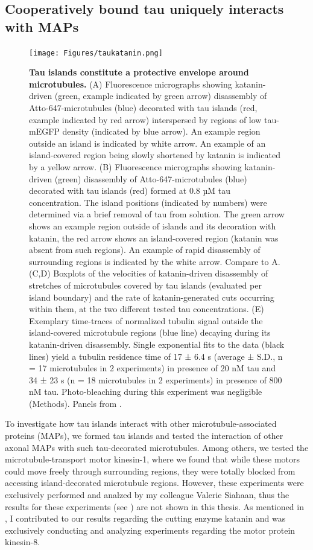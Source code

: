 \subsection{Cooperatively bound tau uniquely interacts with MAPs}
\begin{figure}[h!]
\centering
\texttt{[image: Figures/taukatanin.png]}
\caption[Tau islands constitute a protective envelope around microtubules.]{
\textbf{Tau islands constitute a protective envelope around microtubules.} (A) Fluorescence micrographs showing katanin-driven (green, example indicated by green arrow) disassembly of Atto-647-microtubules (blue) decorated with tau islands (red, example indicated by red arrow) interspersed by regions of low tau-mEGFP density (indicated by blue arrow). An example region outside an island is indicated by white arrow. An example of an island-covered region being slowly shortened by katanin is indicated by a yellow arrow. (B) Fluorescence micrographs showing katanin-driven (green) disassembly of Atto-647-microtubules (blue) decorated with tau islands (red) formed at 0.8 µM tau concentration. The island positions (indicated by numbers) were determined via a brief removal of tau from solution. The green arrow shows an example region outside of islands and its decoration with katanin, the red arrow shows an island-covered region (katanin was absent from such regions). An example of rapid disassembly of surrounding regions is indicated by the white arrow. Compare to A. (C,D) Boxplots of the velocities of katanin-driven disassembly of stretches of microtubules covered by tau islands (evaluated per island boundary) and the rate of katanin-generated cuts occurring within them, at the two different tested tau concentrations. (E) Exemplary time-traces of normalized tubulin signal outside the island-covered microtubule regions (blue line) decaying during its katanin-driven disassembly. Single exponential fits to the data (black lines) yield a tubulin residence time of 17 ± 6.4 s (average ± S.D., n = 17 microtubules in 2 experiments) in presence of 20 nM tau and 34 ± 23 s (n = 18 microtubules in 2 experiments) in presence of 800 nM tau. Photo-bleaching during this experiment was negligible (Methods). Panels from \cite{Siahaan2019a}.
	}\label{taukatanin}
\end{figure}
To investigate how tau islands interact with other microtubule-associated proteins (MAPs), we formed tau islands and tested the interaction of other axonal MAPs with such tau-decorated microtubules. Among others, we tested the microtubule-transport motor kinesin-1, where we found that while these motors could move freely through surrounding regions, they were totally blocked from accessing island-decorated microtubule regions. However, these experiments were exclusively performed and analzed by my colleague Valerie Siahaan, thus the results for these experiments (see \cite{Siahaan2019a}) are not shown in this thesis. As mentioned in , I contributed to our results regarding the cutting enzyme katanin and was exclusively conducting and analyzing experiments regarding the motor protein kinesin-8.\par


